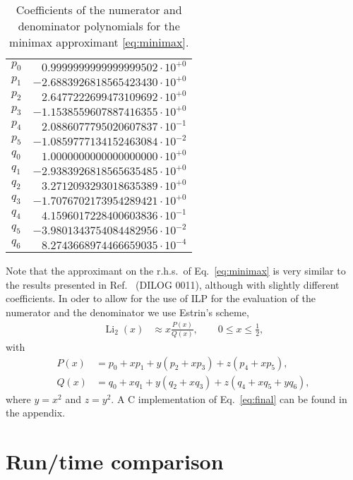 \documentclass[10pt,DIV16,twocolumn,numbers=noenddot]{scrartcl}
\newcommand{\Li}{\operatorname{Li}_2}
\begin{document}
\begin{table}[t]
  \centering
  \caption{Coefficients of the numerator and denominator polynomials
    for the minimax approximant \eqref{eq:minimax}.}
  \begin{tabular}{lr}
    \toprule
    $p_0$ & $ 0.9999999999999999502\cdot 10^{+0}$ \\
    $p_1$ & $-2.6883926818565423430\cdot 10^{+0}$ \\
    $p_2$ & $ 2.6477222699473109692\cdot 10^{+0}$ \\
    $p_3$ & $-1.1538559607887416355\cdot 10^{+0}$ \\
    $p_4$ & $ 2.0886077795020607837\cdot 10^{-1}$ \\
    $p_5$ & $-1.0859777134152463084\cdot 10^{-2}$ \\
    $q_0$ & $ 1.0000000000000000000\cdot 10^{+0}$ \\
    $q_1$ & $-2.9383926818565635485\cdot 10^{+0}$ \\
    $q_2$ & $ 3.2712093293018635389\cdot 10^{+0}$ \\
    $q_3$ & $-1.7076702173954289421\cdot 10^{+0}$ \\
    $q_4$ & $ 4.1596017228400603836\cdot 10^{-1}$ \\
    $q_5$ & $-3.9801343754084482956\cdot 10^{-2}$ \\
    $q_6$ & $ 8.2743668974466659035\cdot 10^{-4}$ \\
    \bottomrule
  \end{tabular}
  \label{tab:coeffs}
\end{table}
%
Note that the approximant on the r.h.s.\ of Eq.~\eqref{eq:minimax} is
very similar to the results presented in Ref.~\cite{morris} (DILOG
0011), although with slightly different coefficients.  In oder to
allow for the use of ILP for the evaluation of the numerator and the
denominator we use Estrin's scheme,
%
\begin{align}
  \Li(x) &\approx x\frac{P(x)}{Q(x)}, \qquad 0\leq x \leq \frac{1}{2},
  \label{eq:final}
\end{align}
%
with
%
\begin{align}
  P(x) &= p_0 + x p_1 + y (p_2 + x p_3) + z (p_4 + x p_5), \\
  Q(x) &= q_0 + x q_1 + y (q_2 + x q_3) + z (q_4 + x q_5 + y q_6),
\end{align}
%
where $y=x^2$ and $z=y^2$.  A C implementation of Eq.~\eqref{eq:final}
can be found in the appendix.

\section{Run\-/time comparison}
\end{document}
